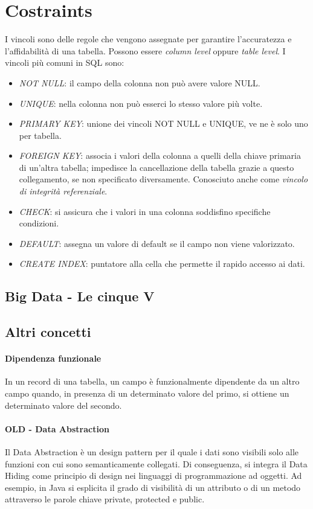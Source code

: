 \documentclass{article}
\begin{document}
    \section{Costraints}
        I vincoli sono delle regole che vengono assegnate per garantire l'accuratezza e l'affidabilità di una tabella. Possono essere \textit{column level} oppure \textit{table level}. I vincoli più comuni in SQL sono:
        \begin{itemize}
            \item \textit{NOT NULL}: il campo della colonna non può avere valore NULL.
            \item \textit{UNIQUE}: nella colonna non può esserci lo stesso valore più volte.
            \item \textit{PRIMARY KEY}: unione dei vincoli NOT NULL e UNIQUE, ve ne è solo uno per tabella.
            \item \textit{FOREIGN KEY}: associa i valori della colonna a quelli della chiave primaria di un'altra tabella; impedisce la cancellazione della tabella grazie a questo collegamento, se non specificato diversamente. Conosciuto anche come \textit{vincolo di integrità referenziale}.
            \item \textit{CHECK}: si assicura che i valori in una colonna soddisfino specifiche condizioni.
            \item \textit{DEFAULT}: assegna un valore di default se il campo non viene valorizzato.
            \item \textit{CREATE INDEX}: puntatore alla cella che permette il rapido accesso ai dati.
        \end{itemize}
    \subsection{Big Data - Le cinque V}
    \subsection{Altri concetti}
        \paragraph{Dipendenza funzionale} In un record di una tabella, un campo è funzionalmente dipendente da un altro campo quando, in presenza di un determinato valore del primo, si ottiene un determinato valore del secondo.
        \paragraph{OLD - Data Abstraction} Il Data Abstraction è un design pattern per il quale i dati sono visibili solo alle funzioni con cui sono semanticamente collegati. Di conseguenza, si integra il Data Hiding come principio di design nei linguaggi di programmazione ad oggetti. Ad esempio, in Java si esplicita il grado di visibilità di un attributo o di un metodo attraverso le parole chiave private, protected e public.
\end{document}
